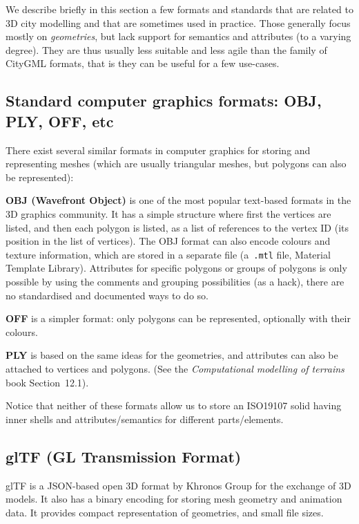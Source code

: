 We describe briefly in this section a few formats and standards that are related to 3D city modelling and that are sometimes used in practice.
Those generally focus mostly on \emph{geometries}, but lack support for semantics and attributes (to a varying degree).
They are thus usually less suitable and less agile than the family of CityGML formats, that is they can be useful for a few use-cases.



\subsection{Standard computer graphics formats: OBJ, PLY, OFF, etc}

There exist several similar formats in computer graphics for storing and representing meshes (which are usually triangular meshes, but polygons can also be represented):

\textbf{OBJ (Wavefront Object)} is one of the most popular text-based formats in the 3D graphics community.
It has a simple structure where first the vertices are listed, and then each polygon is listed, as a list of references to the vertex ID (its position in the list of vertices).
The OBJ format can also encode colours and texture information, which are stored in a separate file (a~\texttt{.mtl} file, Material Template Library).
Attributes for specific polygons or groups of polygons is only possible by using the comments and grouping possibilities (as a hack), there are no standardised and documented ways to do so.

\textbf{OFF} is a simpler format: only polygons can be represented, optionally with their colours.

\textbf{PLY} is based on the same ideas for the geometries, and attributes can also be attached to vertices and polygons. (See the \emph{Computational modelling of terrains} book Section~12.1).

Notice that neither of these formats allow us to store an ISO19107 solid having inner shells and attributes/semantics for different parts/elements.


\subsection{glTF (GL Transmission Format)}
glTF is a JSON-based open 3D format by Khronos Group for the exchange of 3D models.
It also has a binary encoding for storing mesh geometry and animation data.
It provides compact representation of geometries, and small file sizes.

